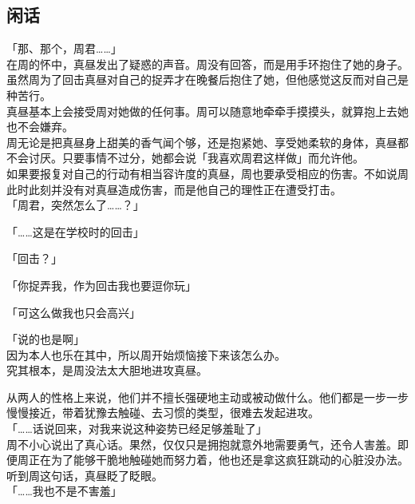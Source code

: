 \subsection{闲话}

「那、那个，周君……」\\

在周的怀中，真昼发出了疑惑的声音。周没有回答，而是用手环抱住了她的身子。\\

虽然周为了回击真昼对自己的捉弄才在晚餐后抱住了她，但他感觉这反而对自己是种苦行。\\

真昼基本上会接受周对她做的任何事。周可以随意地牵牵手摸摸头，就算抱上去她也不会嫌弃。\\

周无论是把真昼身上甜美的香气闻个够，还是抱紧她、享受她柔软的身体，真昼都不会讨厌。只要事情不过分，她都会说「我喜欢周君这样做」而允许他。\\

如果要报复对自己的行动有相当容许度的真昼，周也要承受相应的伤害。不如说周此时此刻并没有对真昼造成伤害，而是他自己的理性正在遭受打击。\\

「周君，突然怎么了……？」

「……这是在学校时的回击」

「回击？」

「你捉弄我，作为回击我也要逗你玩」

「可这么做我也只会高兴」

「说的也是啊」\\

因为本人也乐在其中，所以周开始烦恼接下来该怎么办。\\

究其根本，是周没法太大胆地进攻真昼。

从两人的性格上来说，他们并不擅长强硬地主动或被动做什么。他们都是一步一步慢慢接近，带着犹豫去触碰、去习惯的类型，很难去发起进攻。\\

「……话说回来，对我来说这种姿势已经足够羞耻了」\\

周不小心说出了真心话。果然，仅仅只是拥抱就意外地需要勇气，还令人害羞。即便周正在为了能够干脆地触碰她而努力着，他也还是拿这疯狂跳动的心脏没办法。\\

听到周这句话，真昼眨了眨眼。\\

「……我也不是不害羞」

